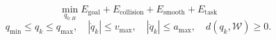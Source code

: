 \[ \min_{q_{0:H}} E_{\mathrm{goal}}+E_{\mathrm{collision}}+E_{\mathrm{smooth}}+E_{\mathrm{task}} \]
\[q_{\min}\le q_k\le q_{\max},\quad |\dot q_k|\le v_{\max},\quad |\ddot q_k|\le a_{\max},\quad d(q_k,\mathcal W)\ge0.\]
